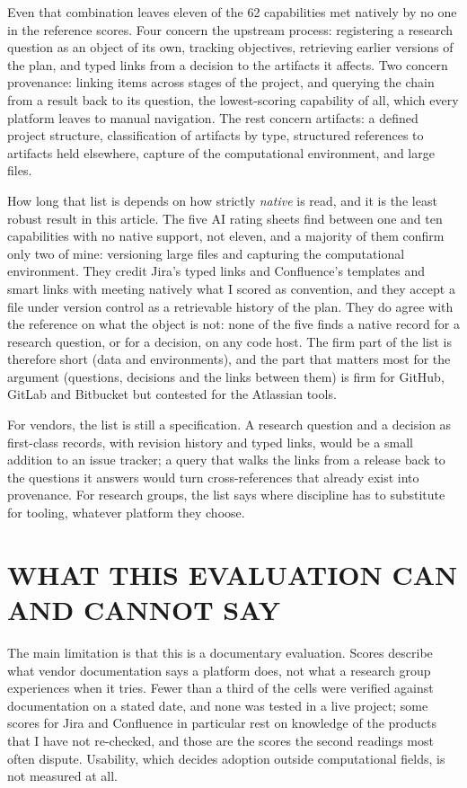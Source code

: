 \documentclass{IEEEcsmag}
\begin{document}
Even that combination leaves eleven of the 62 capabilities met natively by no one in the reference scores. Four concern the upstream process: registering a research question as an object of its own, tracking objectives, retrieving earlier versions of the plan, and typed links from a decision to the artifacts it affects. Two concern provenance: linking items across stages of the project, and querying the chain from a result back to its question, the lowest-scoring capability of all, which every platform leaves to manual navigation. The rest concern artifacts: a defined project structure, classification of artifacts by type, structured references to artifacts held elsewhere, capture of the computational environment, and large files.

How long that list is depends on how strictly \emph{native} is read, and it is the least robust result in this article. The five AI rating sheets find between one and ten capabilities with no native support, not eleven, and a majority of them confirm only two of mine: versioning large files and capturing the computational environment. They credit Jira's typed links and Confluence's templates and smart links with meeting natively what I scored as convention, and they accept a file under version control as a retrievable history of the plan. They do agree with the reference on what the object is not: none of the five finds a native record for a research question, or for a decision, on any code host. The firm part of the list is therefore short (data and environments), and the part that matters most for the argument (questions, decisions and the links between them) is firm for GitHub, GitLab and Bitbucket but contested for the Atlassian tools.

For vendors, the list is still a specification. A research question and a decision as first-class records, with revision history and typed links, would be a small addition to an issue tracker; a query that walks the links from a release back to the questions it answers would turn cross-references that already exist into provenance. For research groups, the list says where discipline has to substitute for tooling, whatever platform they choose.

\section{WHAT THIS EVALUATION CAN AND CANNOT SAY}

The main limitation is that this is a documentary evaluation. Scores describe what vendor documentation says a platform does, not what a research group experiences when it tries. Fewer than a third of the cells were verified against documentation on a stated date, and none was tested in a live project; some scores for Jira and Confluence in particular rest on knowledge of the products that I have not re-checked, and those are the scores the second readings most often dispute. Usability, which decides adoption outside computational fields, is not measured at all.
\end{document}
